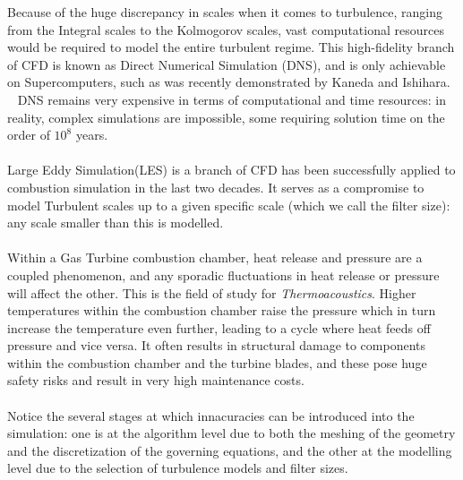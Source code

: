 \documentclass[titlepage,11pt,letterpaper]{article}
\begin{document}
\noindent Because of the huge discrepancy in scales when it comes to turbulence, ranging from the Integral scales to the Kolmogorov scales, vast computational resources would be required to model the entire turbulent regime. This high-fidelity branch of CFD is known as Direct Numerical Simulation (DNS), and is only achievable on Supercomputers, such as was recently demonstrated by Kaneda and Ishihara. ~\cite{kaneda:2006} DNS remains very expensive in terms of  computational and time resources: in reality, complex simulations are impossible, some requiring solution time on the order of $10^8$ years.\\ \\
\noindent Large Eddy Simulation(LES) is a branch of CFD has been successfully applied to combustion simulation in the last two decades. It serves as a compromise to model Turbulent scales up to a given specific scale (which we call the filter size): any scale smaller than this is modelled. \\ \\
\noindent Within a Gas Turbine combustion chamber, heat release and pressure are a coupled phenomenon, and any sporadic fluctuations in heat release or pressure will affect the other. This is the field of study for \textit{Thermoacoustics}. Higher temperatures within the combustion chamber raise the pressure which in turn increase the temperature even further, leading to a cycle where heat feeds off pressure and vice versa. It often results in structural damage to components within the combustion chamber and the turbine blades, and these pose huge safety risks and result in very high maintenance costs.\\ \\
\noindent Notice the several stages at which innacuracies can be introduced into the simulation: one is at the algorithm level due to both the meshing of the geometry and the discretization of the governing equations, and the other at the modelling level due to the selection of turbulence models and filter sizes. \\



\end{document}
